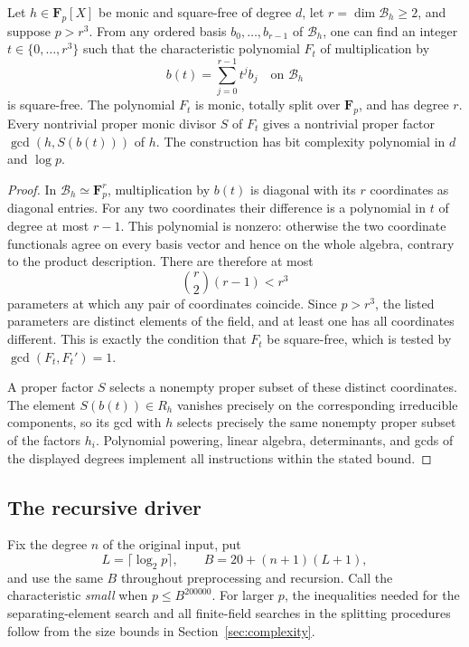 \begin{lemma}
\label{driver:separator}
Let $h\in\mathbf F_p[X]$ be monic and square-free of degree $d$, let
$r=\dim\mathcal B_h\ge2$, and suppose $p>r^3$.  From any ordered basis
$b_0,\ldots,b_{r-1}$ of $\mathcal B_h$, one can find an integer
$t\in\{0,\ldots,r^3\}$ such that the characteristic polynomial $F_t$ of
multiplication by
\[
 b(t)=\sum_{j=0}^{r-1}t^j b_j
 \quad\text{on }\mathcal B_h
\]
is square-free.  The polynomial $F_t$ is monic, totally split over
$\mathbf F_p$, and has degree $r$.  Every nontrivial proper monic divisor
$S$ of $F_t$ gives a nontrivial proper factor
$\gcd(h,S(b(t)))$ of $h$.
The construction has bit complexity polynomial in $d$ and $\log p$.
\end{lemma}

\begin{proof}
In $\mathcal B_h\simeq\mathbf F_p^r$, multiplication by $b(t)$ is diagonal
with its $r$ coordinates as diagonal entries.  For any two coordinates their
difference is a polynomial in $t$ of degree at most $r-1$.  This polynomial
is nonzero: otherwise the two coordinate functionals agree on every basis
vector and hence on the whole algebra, contrary to the product description.
There are therefore at most
\[
 \binom r2(r-1)<r^3
\]
parameters at which any pair of coordinates coincide.  Since $p>r^3$, the
listed parameters are distinct elements of the field, and at least one has
all coordinates different.  This is exactly the condition that $F_t$ be
square-free, which is tested by $\gcd(F_t,F_t')=1$.

A proper factor $S$ selects a nonempty proper subset of these distinct
coordinates.  The element $S(b(t))\in R_h$ vanishes precisely on the
corresponding irreducible components, so its gcd with $h$ selects precisely
the same nonempty proper subset of the factors $h_i$.  Polynomial powering,
linear algebra, determinants, and gcds of the displayed degrees implement
all instructions within the stated bound.
\end{proof}

\subsection{The recursive driver}

Fix the degree $n$ of the original input, put
\begin{equation}
 L=\lceil\log_2p\rceil,
 \qquad B=20+(n+1)(L+1),
 \label{driver:parameters}
\end{equation}
and use the same $B$ throughout preprocessing and recursion.  Call the
characteristic \emph{small} when $p\le B^{200000}$.  For larger $p$, the
inequalities needed for the separating-element search and all finite-field
searches in the splitting procedures follow from the size bounds in
Section~\ref{sec:complexity}.

